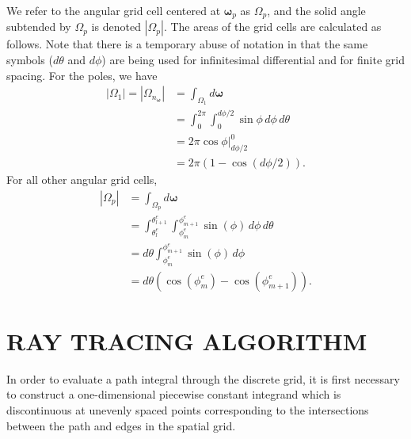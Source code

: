 \documentclass[ms,cpyr,lof,lot]{uathesis}
\newcommand\abs[1]{\left| #1 \right|}
\renewcommand\vec\bm
\newcommand\nomega{{n_{\vec{\omega}}}}
\begin{document}
We refer to the angular grid cell centered at $\vec{\omega}_p$ as $\Omega_p$, and the solid angle subtended by $\Omega_p$ is denoted $\abs{\Omega_p}$.
The areas of the grid cells are calculated as follows.
Note that there is a temporary abuse of notation in that the same symbols ($d\theta$ and $d\phi$) are being used for infinitesimal differential and for finite grid spacing.
For the poles, we have
\begin{align*}
  \abs{\Omega_1} = \abs{\Omega_\nomega} &= \int_{\Omega_1} d{\vec{\omega}} \\
  &= \int_0^{2\pi}\int_0^{d\phi/2} \sin\phi\, d\phi\, d\theta \\
  &= 2\pi \cos\phi \Big|_{d\phi/2}^0 \\
  &= 2\pi(1-\cos(d\phi/2)).
\end{align*}
For all other angular grid cells,
\begin{align*}
  \abs{\Omega_p} &= \int_{\Omega_p} d{\vec{\omega}} \\
                 &= \int_{\theta_l^e}^{\theta_{l+1}^e}\int_{\phi_m^e}^{\phi_{m+1}^e} \sin(\phi)\, d\phi\, d\theta \\
                 &= d\theta \int_{\phi_m^e}^{\phi_{m+1}^e} \sin(\phi)\, d\phi \\
                 &= d\theta\left( \cos(\phi_m^e)-\cos(\phi_{m+1}^e) \right).
\end{align*}

\chapter{RAY TRACING ALGORITHM}
\label{chap:ray_tracing}


In order to evaluate a path integral through the discrete grid, it
is first necessary to construct a one-dimensional piecewise constant integrand
which is discontinuous at unevenly spaced points corresponding to the
intersections between the path and edges in the spatial grid.
\end{document}
